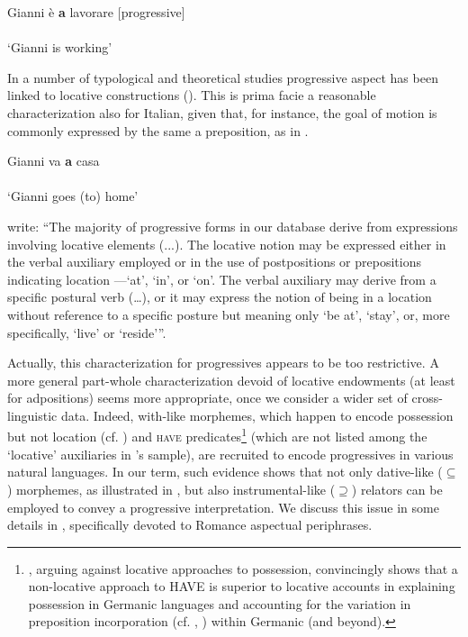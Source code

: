 \documentclass[output=paper,modfonts,nonflat,newtxmath,colorlinks,citecolor=brown]{langsci/langscibook}
\begin{document}
     \ex \label{ex:franco:10b}
    \gll Gianni è \textbf{a} lavorare   \hfill [progressive]\\
        \\
    \glt ‘Gianni is working’
    \z
    \z
  

In a number of typological and theoretical studies progressive aspect has been linked to locative constructions (\citealt{BybeeEtAl1994,MateuAmadas1999,DemirdacheUribe-Etxebarria1997}).  This is {prima facie} a reasonable characterization also for Italian, given that, for instance, the goal of motion is commonly expressed by the same {a} preposition, as in . 

\ea%
    \label{ex:franco:11}
    \gll  Gianni va \textbf{a} casa\\
         \\
    \glt ‘Gianni goes (to) home’
    \z

\citet[129-130]{BybeeEtAl1994} write: “The majority of progressive forms in our database derive from expressions involving locative elements (...). The locative notion may be expressed either in the verbal auxiliary employed or in the use of postpositions or prepositions indicating location —‘at’, ‘in’, or ‘on’. The verbal auxiliary may derive from a specific postural verb (…), or it may express the notion of being in a location without reference to a specific posture but meaning only ‘be at’, ‘stay’, or, more specifically, ‘live’ or ‘reside’”.

Actually, this characterization for progressives appears to be too restrictive. A more general part-whole characterization devoid of locative endowments (at least for adpositions) seems more appropriate, once we consider a wider set of cross-linguistic data. Indeed, {with}{}-like morphemes, which happen to encode possession but not location (cf. \citealt{Levinson2011}) and \textsc{have} predicates\footnote{\citet{Levinson2011}, arguing against locative approaches to possession, convincingly shows that a non-locative approach to HAVE is superior to locative accounts in explaining possession in Germanic languages and accounting for the variation in preposition incorporation (cf. \citealt{Kayne1993}, \citealt{Harley2002}) within Germanic (and beyond).} (which are not listed among the ‘locative’ auxiliaries in \citeauthor{BybeePerkinsPagliuca1994}’s sample), are recruited to encode progressives in various natural languages. In our term, such evidence shows that not only dative-like (${\subseteq}$) morphemes, as illustrated in , but also instrumental-like (${\supseteq}$) relators can be employed to convey a progressive interpretation. We discuss this issue in some details in , specifically devoted to Romance aspectual periphrases. 
\end{document}
